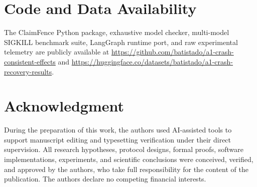 \documentclass[10pt,journal]{IEEEtran}
\def\CF{ClaimFence}%
\def\texttt#1{#1}%
\theoremstyle{definition}
\theoremstyle{remark}
\newcommand{\CF}{\textsc{ClaimFence}}
\begin{document}
\section*{Code and Data Availability}
The \CF{} Python package, exhaustive model checker, multi-model \texttt{SIGKILL} benchmark suite, \texttt{LangGraph} runtime port, and raw experimental telemetry are publicly available at \url{https://github.com/batistado/a1-crash-consistent-effects} and \url{https://huggingface.co/datasets/batistado/a1-crash-recovery-results}.

\section*{Acknowledgment}
During the preparation of this work, the authors used AI-assisted tools to support manuscript editing and typesetting verification under their direct supervision. All research hypotheses, protocol designs, formal proofs, software implementations, experiments, and scientific conclusions were conceived, verified, and approved by the authors, who take full responsibility for the content of the publication. The authors declare no competing financial interests.



\end{document}
